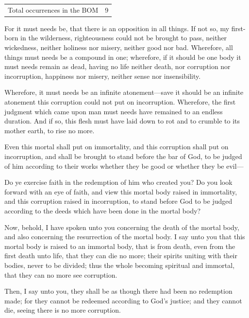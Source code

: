 			\begin{tabular}{ll}
				Total occurrences in the BOM & 9
			\end{tabular}
			
			\begin{compactdesc}
				\item[2 Nephi 2:11] For it must needs be, that there is an opposition in all things. If not so, my first-born in the wilderness, righteousness could not be brought to pass, neither wickedness, neither holiness nor misery, neither good nor bad. Wherefore, all things must needs be a compound in one; wherefore, if it should be one body it must needs remain as dead, having no life neither death, nor corruption nor incorruption, happiness nor misery, neither sense nor insensibility.
				\item[2 Nephi 9:7] Wherefore, it must needs be an infinite atonement---save it should be an infinite atonement this corruption could not put on incorruption. Wherefore, the first judgment which came upon man must needs have remained to an endless duration. And if so, this flesh must have laid down to rot and to crumble to its mother earth, to rise no more.
				\item[Mosiah 16:10] Even this mortal shall put on immortality, and this corruption shall put on incorruption, and shall be brought to stand before the bar of God, to be judged of him according to their works whether they be good or whether they be evil---
				\item[Alma 5:15] Do ye exercise faith in the redemption of him who created you? Do you look forward with an eye of faith, and view this mortal body raised in immortality, and this corruption raised in incorruption, to stand before God to be judged according to the deeds which have been done in the mortal body?
				\item[Alma 11:45] Now, behold, I have spoken unto you concerning the death of the mortal body, and also concerning the resurrection of the mortal body. I say unto you that this mortal body is raised to an immortal body, that is from death, even from the first death unto life, that they can die no more; their spirits uniting with their bodies, never to be divided; thus the whole becoming spiritual and immortal, that they can no more see corruption.
				\item[Alma 12:18] Then, I say unto you, they shall be as though there had been no redemption made; for they cannot be redeemed according to God's justice; and they cannot die, seeing there is no more corruption.

\end{compactdesc}
